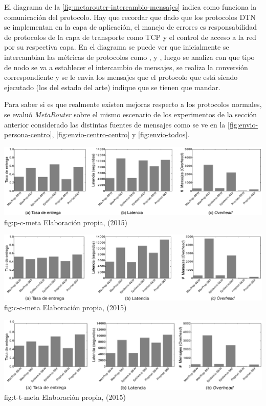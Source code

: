 El diagrama de la \ref{fig:metarouter-intercambio-mensajes} indica como funciona
la comunicación del protocolo. Hay que recordar que dado que los protocolos DTN
se implementan en la capa de aplicación, el manejo de errores es responsabilidad
de protocolos de la capa de transporte como TCP y el control de acceso a la red
por su respectiva capa. En el diagrama se puede ver que inicialmente se
intercambian las métricas de protocolos como \syf, \prophet{} y \maxprop, luego
se analiza con que tipo de nodo se va a establecer el intercambio de mensajes,
se realiza la conversión correspondiente y se le envía los mensajes que el
protocolo que está siendo ejecutado (los del estado del arte) indique que se
tienen que mandar.




Para saber si es que realmente existen mejoras respecto a los protocolos
normales, se evaluó \textit{MetaRouter} sobre el mismo escenario de los
experimentos de la sección anterior considerado las distintas fuentes de
mensajes como se ve en la \ref{fig:envio-persona-centro},
\ref{fig:envio-centro-centro} y \ref{fig:envio-todos}.


{\includegraphics[scale=0.27]{desarrollo/paper_pasado/graficos/desde_personas.eps}}{fig:p-c-meta}
{Elaboración propia, (2015)}


{\includegraphics[scale=0.27]{desarrollo/paper_pasado/graficos/entre_centros.eps}}{fig:c-c-meta}
{Elaboración propia, (2015)}


{\includegraphics[scale=0.27]{desarrollo/paper_pasado/graficos/todos.eps}}{fig:t-t-meta}
{Elaboración propia, (2015)}


